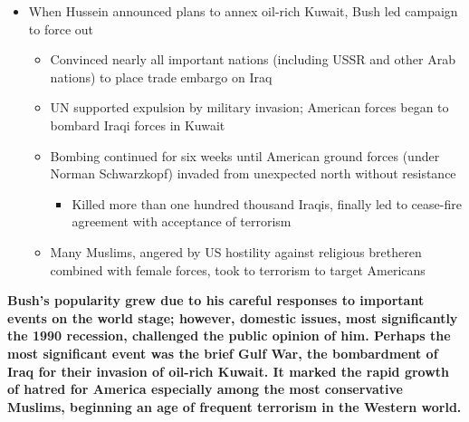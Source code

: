 \documentclass[a4paper]{article}
\begin{document}
{\begin{itemize}
\begin{itemize}
                    \item When Hussein announced plans to annex oil-rich Kuwait, Bush led campaign to force out
                    \begin{itemize}
                        \item Convinced nearly all important nations (including USSR and other Arab nations) to place trade embargo on Iraq
                        \item UN supported expulsion by military invasion; American forces began to bombard Iraqi forces in Kuwait
                        \item Bombing continued for six weeks until American ground forces (under Norman Schwarzkopf) invaded from unexpected north without resistance
                        \begin{itemize}
                            \item Killed more than one hundred thousand Iraqis, finally led to cease-fire agreement with acceptance of terrorism
                        \end{itemize}
                        \item Many Muslims, angered by US hostility against religious bretheren combined with female forces, took to terrorism to target Americans
                    \end{itemize}
                \end{itemize}
            \end{itemize}
            \textbf{Bush's popularity grew due to his careful responses to important events on the world stage; however, domestic issues, most significantly the 1990 recession, challenged the public opinion of him. Perhaps the most significant event was the brief Gulf War, the bombardment of Iraq for their invasion of oil-rich Kuwait. It marked the rapid growth of hatred for America especially among the most conservative Muslims, beginning an age of frequent terrorism in the Western world.}
        }
\end{document}

